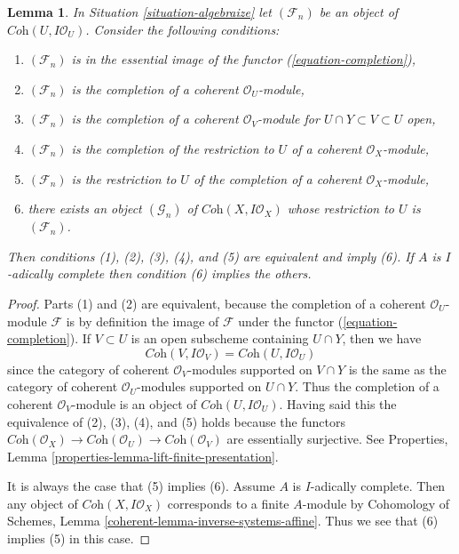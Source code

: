 \documentclass[10pt,a4paper]{amsart}
\theoremstyle{plain}
\newtheorem{lemma}[subsection]{Lemma}
\theoremstyle{definition}
\theoremstyle{remark}
\numberwithin{equation}{subsection}
\begin{document}
\begin{lemma}
\label{lemma-essential-image-completion}
In Situation \ref{situation-algebraize} let $(\mathcal{F}_n)$
be an object of $\textit{Coh}(U, I\mathcal{O}_U)$. Consider the
following conditions:
\begin{enumerate}
\item $(\mathcal{F}_n)$ is in the essential image
of the functor (\ref{equation-completion}),
\item $(\mathcal{F}_n)$ is the completion of a
coherent $\mathcal{O}_U$-module,
\item $(\mathcal{F}_n)$ is the completion of a coherent
$\mathcal{O}_V$-module for $U \cap Y \subset V \subset U$ open,
\item $(\mathcal{F}_n)$ is the completion of
the restriction to $U$ of a coherent $\mathcal{O}_X$-module,
\item $(\mathcal{F}_n)$ is the restriction to $U$ of
the completion of a coherent $\mathcal{O}_X$-module,
\item there exists an object $(\mathcal{G}_n)$ of
$\textit{Coh}(X, I\mathcal{O}_X)$ whose restriction
to $U$ is $(\mathcal{F}_n)$.
\end{enumerate}
Then conditions (1), (2), (3), (4), and (5) are equivalent and imply (6).
If $A$ is $I$-adically complete then condition (6) implies the others.
\end{lemma}

\begin{proof}
Parts (1) and (2) are equivalent, because the completion of a coherent
$\mathcal{O}_U$-module $\mathcal{F}$ is by definition the image of
$\mathcal{F}$ under the functor (\ref{equation-completion}).
If $V \subset U$ is an open subscheme containing $U \cap Y$, then we have
$$
\textit{Coh}(V, I\mathcal{O}_V) =
\textit{Coh}(U, I\mathcal{O}_U)
$$
since the category of coherent $\mathcal{O}_V$-modules supported on
$V \cap Y$ is the same as the category of coherent $\mathcal{O}_U$-modules
supported on $U \cap Y$. Thus the completion of a coherent
$\mathcal{O}_V$-module is an object of $\textit{Coh}(U, I\mathcal{O}_U)$.
Having said this the equivalence of (2), (3), (4), and (5)
holds because the functors
$\textit{Coh}(\mathcal{O}_X) \to \textit{Coh}(\mathcal{O}_U) \to
\textit{Coh}(\mathcal{O}_V)$ are essentially surjective.
See Properties, Lemma \ref{properties-lemma-lift-finite-presentation}.

\medskip\noindent
It is always the case that (5) implies (6). Assume $A$ is $I$-adically complete.
Then any object of $\textit{Coh}(X, I\mathcal{O}_X)$ corresponds to a finite
$A$-module by Cohomology of Schemes, Lemma
\ref{coherent-lemma-inverse-systems-affine}.
Thus we see that (6) implies (5) in this case.
\end{proof}
\end{document}
